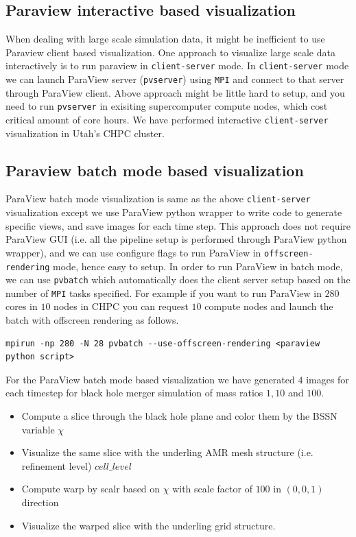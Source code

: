 \subsection{Paraview interactive based visualization}
When dealing with large scale simulation data, it might be inefficient to use Paraview client based visualization. One approach to visualize large scale data interactively is to run paraview in \texttt{client-server} mode. 
In \texttt{client-server} mode we can launch ParaView server (\texttt{pvserver}) using \texttt{MPI} and connect to that server through ParaView client. Above approach might be little hard to setup, and you need to run \texttt{pvserver} in 
exisiting supercomputer compute nodes, which cost critical amount of core hours. We have performed interactive \texttt{client-server} visualization in Utah's CHPC cluster. 

\subsection{Paraview batch mode based visualization}
ParaView batch mode visualization is same as the above \texttt{client-server} visualization except we use ParaView python wrapper to write code to generate specific views, and save images for each time step. This approach does not require 
ParaView GUI (i.e. all the pipeline setup is performed through ParaView python wrapper), and we can use configure flags to run ParaView in \texttt{offscreen-rendering} mode, hence easy to setup. In order to run ParaView in batch mode, 
we can use \texttt{pvbatch} which automatically does the client server setup based on the number of \texttt{MPI} tasks specified. For example if you want to run ParaView in $280$ cores in $10$ nodes in CHPC you can request $10$
compute nodes and launch the batch with offscreen rendering as follows. 

\begin{lstlisting}[basicstyle=\small]
mpirun -np 280 -N 28 pvbatch --use-offscreen-rendering <paraview python script>
\end{lstlisting}

For the ParaView batch mode based visualization we have generated $4$ images for each timestep for black hole merger simulation of mass ratios $1,10$ and $100$. 
\begin{itemize}
    \item Compute a slice through the black hole plane and color them by the BSSN variable $\chi$
    \item Visualize the same slice with the underling AMR mesh structure (i.e. refinement level) $cell\_level$    
    \item Compute warp by scalr based on $\chi$ with scale factor of $100$ in $(0,0,1)$ direction
    \item Visualize the warped slice with the underling grid structure. 
\end{itemize}

